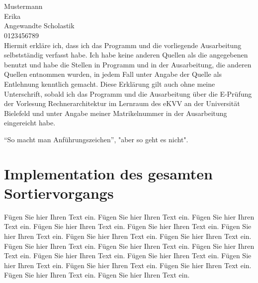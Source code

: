 \documentclass[12pt]{article}
\begin{document}
\newcommand{\3}{\ss}

\begin{center}
  \\[1cm]
  \\[3cm]
\end{center}

 Mustermann\\

 Erika\\

 Angewandte Scholastik\\

 0123456789\\[3cm]

\noindent Hiermit erkläre ich, dass ich das Programm und die
vorliegende Ausarbeitung selbstständig verfasst habe. Ich habe keine
anderen Quellen als die angegebenen benutzt und habe die Stellen in
Programm und in der Ausarbeitung, die anderen Quellen entnommen
wurden, in jedem Fall unter Angabe der Quelle als Entlehnung kenntlich
gemacht. Diese Erklärung gilt auch ohne meine Unterschrift, sobald ich
das Programm und die Ausarbeitung über die E-Prüfung der Vorlesung
Rechnerarchitektur im Lernraum des eKVV an der Universität Bielefeld
und unter Angabe meiner Matrikelnummer in der Ausarbeitung eingereicht
habe.

\thispagestyle{empty}
\newpage
\setcounter{page}{1}

``So macht man Anführungszeichen'', "aber so geht es nicht".

\section{Implementation des gesamten Sortiervorgangs}

Fügen Sie hier Ihren Text ein. Fügen Sie hier Ihren Text ein. Fügen
Sie hier Ihren Text ein. Fügen Sie hier Ihren Text ein. Fügen Sie hier
Ihren Text ein. Fügen Sie hier Ihren Text ein. Fügen Sie hier Ihren
Text ein. Fügen Sie hier Ihren Text ein. Fügen Sie hier Ihren Text
ein. Fügen Sie hier Ihren Text ein. Fügen Sie hier Ihren Text
ein. Fügen Sie hier Ihren Text ein. Fügen Sie hier Ihren Text
ein. Fügen Sie hier Ihren Text ein. Fügen Sie hier Ihren Text
ein. Fügen Sie hier Ihren Text ein. Fügen Sie hier Ihren Text
ein. Fügen Sie hier Ihren Text ein.
\end{document}
